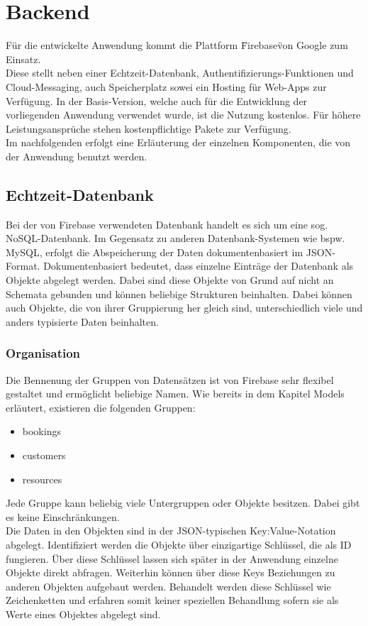 \section{Backend}
Für die entwickelte Anwendung kommt die Plattform \"Firebase\" von Google zum Einsatz.
\\
Diese stellt neben einer Echtzeit-Datenbank, Authentifizierungs-Funktionen und Cloud-Messaging, auch Speicherplatz sowei ein Hosting für Web-Apps zur Verfügung.
In der Basis-Version, welche auch für die Entwicklung der vorliegenden Anwendung verwendet wurde, ist die Nutzung kostenlos. Für höhere Leistungsansprüche stehen kostenpflichtige Pakete zur Verfügung.\\
Im nachfolgenden erfolgt eine Erläuterung der einzelnen Komponenten, die von der Anwendung benutzt werden.

\subsection{Echtzeit-Datenbank}
Bei der von Firebase verwendeten Datenbank handelt es sich um eine sog. NoSQL-Datenbank. Im Gegensatz zu anderen Datenbank-Systemen wie bspw. MySQL, erfolgt die Abspeicherung der Daten dokumentenbasiert im JSON-Format.
Dokumentenbasiert bedeutet, dass einzelne Einträge der Datenbank als Objekte abgelegt werden. Dabei sind diese Objekte von Grund auf nicht an Schemata gebunden und können beliebige Strukturen beinhalten.
Dabei können auch Objekte, die von ihrer Gruppierung her gleich sind, unterschiedlich viele und anders typisierte Daten beinhalten.\\


\subsubsection{Organisation}
Die Bennenung der Gruppen von Datensätzen ist von Firebase sehr flexibel gestaltet und ermöglicht beliebige Namen.
Wie bereits in dem Kapitel Models erläutert, existieren die folgenden Gruppen:
\begin{itemize}
\item bookings
\item customers
\item resources
\end{itemize}

Jede Gruppe kann beliebig viele Untergruppen oder Objekte besitzen. Dabei gibt es keine Einschränkungen.\\
Die Daten in den Objekten sind in der JSON-typischen Key:Value-Notation abgelegt.
Identifiziert werden die Objekte über einzigartige Schlüssel, die als ID fungieren.
Über diese Schlüssel lassen sich später in der Anwendung einzelne Objekte direkt abfragen.
Weiterhin können über diese Keys Beziehungen zu anderen Objekten aufgebaut werden.
Behandelt werden diese Schlüssel wie Zeichenketten und erfahren somit keiner speziellen Behandlung sofern sie als Werte eines Objektes abgelegt sind.

